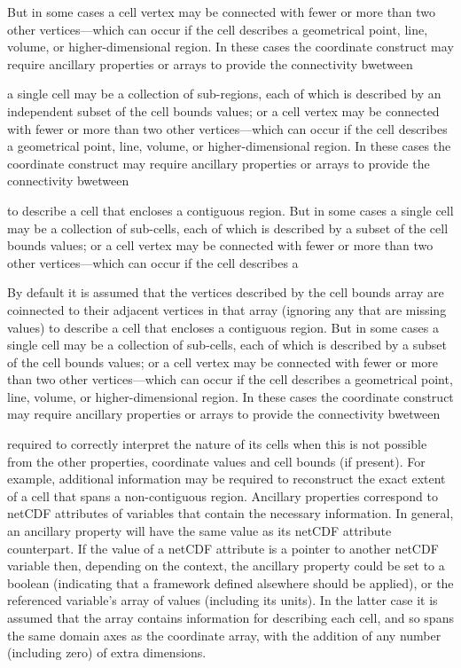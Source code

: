 But in some cases a cell vertex may be connected with fewer or more
than two other vertices---which can occur if the cell describes a
geometrical point, line, volume, or higher-dimensional region. In
these cases the coordinate construct may require ancillary properties
or arrays to provide the connectivity bwetween

a single cell may be a collection of sub-regions,
each of which is described by an independent subset of the cell bounds
values; or a cell vertex may be connected with fewer or more than two
other vertices---which can occur if the cell describes a geometrical
point, line, volume, or higher-dimensional region. In these cases the
coordinate construct may require ancillary properties or arrays to
provide the connectivity bwetween



to describe a cell that encloses a contiguous
region. But in some cases a single cell may be a collection of
sub-cells, each of which is described by a subset of the cell bounds
values; or a cell vertex may be connected with fewer or more than two
other vertices---which can occur if the cell describes a


By default it is assumed that the vertices described by the cell
bounds array are coinnected to their adjacent vertices in that array
(ignoring any that are missing values) to describe a cell that
encloses a contiguous region. But in some cases a single cell may be a
collection of sub-cells, each of which is described by a subset of the
cell bounds values; or a cell vertex may be connected with fewer or
more than two other vertices---which can occur if the cell describes a
geometrical point, line, volume, or higher-dimensional region. In
these cases the coordinate construct may require ancillary properties
or arrays to provide the connectivity bwetween 



required to correctly interpret the nature of
its cells when this is not possible from the other properties,
coordinate values and cell bounds (if present). For example,
additional information may be required to reconstruct the exact extent
of a cell that spans a non-contiguous region. Ancillary properties
correspond to netCDF attributes of variables that contain the
necessary information. In general, an ancillary property will have the
same value as its netCDF attribute counterpart. If the value of a
netCDF attribute is a pointer to another netCDF variable then,
depending on the context, the ancillary property could be set to a
boolean (indicating that a framework defined alsewhere should be
applied), or the referenced variable's array of values (including its
units). In the latter case it is assumed that the array contains
information for describing each cell, and so spans the same domain
axes as the coordinate array, with the addition of any number
(including zero) of extra dimensions.

